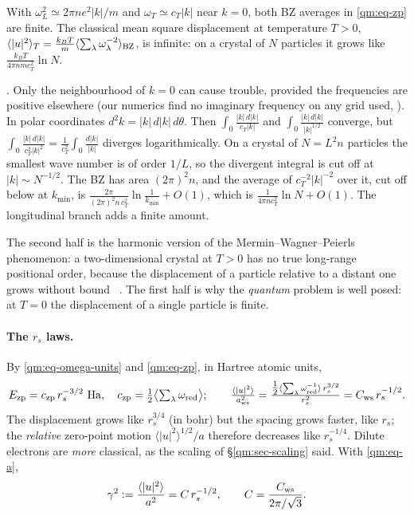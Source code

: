 \begin{proposition}\label{qm:prop-finite}
With $\omega_L^2\simeq2\pi ne^2|k|/m$ and $\omega_T\simeq c_T|k|$ near $k=0$, both BZ averages in \eqref{qm:eq-zp}
are finite. The classical mean square displacement at temperature $T>0$,
$\langle|u|^2\rangle_T=\frac{k_BT}{m}\langle\sum_\lambda\omega_\lambda^{-2}\rangle_{\rm BZ}$, is infinite: on a
crystal of $N$ particles it grows like $\frac{k_BT}{4\pi n m c_T^2}\ln N$.
\end{proposition}
\begin{humanproof}
\tierC. Only the neighbourhood of $k=0$ can cause trouble, provided the frequencies are positive elsewhere (our
numerics find no imaginary frequency on any grid used, \tierX). In polar
coordinates $d^2k=|k|\,d|k|\,d\theta$. Then $\int_0 \frac{|k|\,d|k|}{c_T|k|}$ and
$\int_0\frac{|k|\,d|k|}{|k|^{1/2}}$ converge, but $\int_0\frac{|k|\,d|k|}{c_T^2|k|^2}=\frac1{c_T^2}\int_0\frac{d|k|}{|k|}$
diverges logarithmically. On a crystal of $N=L^2n$ particles the smallest wave number is of order $1/L$, so the
divergent integral is cut off at $|k|\sim N^{-1/2}$. The BZ has area $(2\pi)^2n$, and the average of
$c_T^{-2}|k|^{-2}$ over it, cut off below at $k_{\min}$, is $\frac{2\pi}{(2\pi)^2n\,c_T^2}\ln\frac1{k_{\min}}+O(1)$,
which is $\frac{1}{4\pi n c_T^2}\ln N+O(1)$. The longitudinal branch adds a finite amount.
\end{humanproof}

The second half is the harmonic version of the Mermin--Wagner--Peierls phenomenon: a two-dimensional crystal at
$T>0$ has no true long-range positional order, because the displacement of a particle relative to a distant one
grows without bound~\cite{mermin} \tierL. The first half is why the \emph{quantum} problem is well posed: at $T=0$ the
displacement of a single particle is finite.

\paragraph{The $r_s$ laws.} By \eqref{qm:eq-omega-units} and \eqref{qm:eq-zp}, in Hartree atomic units,
\begin{equation}\label{qm:eq-laws}
E_{\rm zp}=c_{\rm zp}\,r_s^{-3/2}\ \text{Ha},\quad c_{\rm zp}=\tfrac12\bigl\langle\textstyle\sum_\lambda\omega_{\rm
red}\bigr\rangle;\qquad
\frac{\langle|u|^2\rangle}{a_{\rm ws}^2}=\frac{\tfrac12\langle\sum_\lambda\omega_{\rm red}^{-1}\rangle\,r_s^{3/2}}{r_s^2}
=C_{\rm ws}\,r_s^{-1/2} .
\end{equation}
The displacement grows like $r_s^{3/4}$ (in bohr) but the spacing grows faster, like $r_s$; the \emph{relative}
zero-point motion $\langle|u|^2\rangle^{1/2}/a$ therefore decreases like $r_s^{-1/4}$. Dilute electrons are \emph{more}
classical, as the scaling of \S\ref{qm:sec-scaling} said. With \eqref{qm:eq-a},
\begin{equation}\label{qm:eq-C}
\gamma^2:=\frac{\langle|u|^2\rangle}{a^2}=C\,r_s^{-1/2},\qquad C=\frac{C_{\rm ws}}{2\pi/\sqrt3}.
\end{equation}

